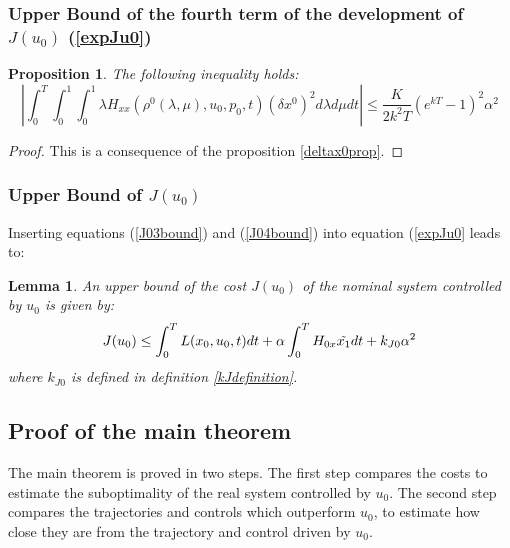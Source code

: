 \documentclass[a4paper,10pt]{article}
\newtheorem{proposition}{Proposition}
\newtheorem{lemm}{Lemma}
\begin{document}
\subsubsection{Upper Bound of the fourth term of the development of 
$J(u_{0})$ (\ref{expJu0})}
\begin{proposition}
    The following inequality holds:
    \begin{equation}
        \left|\int_{0}^{T} \int_{0}^{1} \int_{0}^{1} 
	\lambda H_{xx}(\rho^{0}(\lambda,\mu),u_{0},p_{0},t)(\delta x^{0})^{2}  
	d \lambda d \mu dt\right|
	\leq \frac{K}{2k^{2}T}\left(e^{kT}-1\right)^{2}\alpha^{2}
        \label{J04bound}
    \end{equation}
\end{proposition}
\begin{proof}
    This is a consequence of the proposition \ref{deltax0prop}.
\end{proof}

\subsubsection{Upper Bound of $J(u_{0})$}\label{upperBoundJ0}
Inserting equations (\ref{J03bound}) and (\ref{J04bound}) into 
equation (\ref{expJu0} leads to:
\begin{lemm} \label{Ju0UpperBoundLemma}
    An upper bound of the cost $J(u_{0})$ of the nominal system 
    controlled by $u_{0}$ is given by:
    \begin{equation}
     J(u_{0}) \leq \int_{0}^{T} L(x_{0},u_{0},t) dt
	+ \alpha \int_{0}^{T} H_{0x} \tilde{x_{1}} dt
	+ k_{J0}\alpha^{2}
        \label{Ju0UpperBound}\\
    \end{equation}
    where $k_{J0}$ is defined in definition 
	\ref{kJdefinition}.
\end{lemm}

\subsection{Proof of the main theorem}
The main theorem is proved in two steps. The first step compares the 
costs to estimate the suboptimality of the real system controlled by 
$u_{0}$. The second step compares the trajectories and controls 
which outperform $u_{0}$, to estimate how close they are from the 
trajectory and control driven by $u_{0}$.
\end{document}
